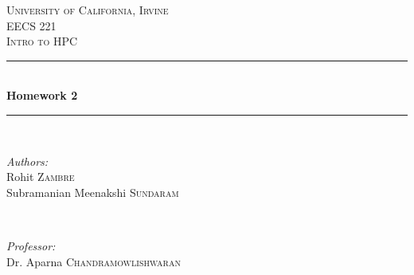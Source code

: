 \documentclass[12pt]{article}
\newcommand{\HRule}{\rule{\linewidth}{0.5mm}} %
\begin{document}
\begin{titlepage}

\center %


\textsc{\LARGE University of California, Irvine}\\[1.5cm] %
\textsc{\Large EECS 221}\\[0.5cm] %
\textsc{\large Intro to HPC}\\[0.5cm] %


\HRule \\[0.4cm]
{ \huge \bfseries Homework 2}\\[0.4cm] %
\HRule \\[1.5cm]


\begin{minipage}{0.4\textwidth}
	\begin{flushleft} \large
		\emph{Authors:}\\
		Rohit \textsc{Zambre}\\ %
		Subramanian Meenakshi \textsc{Sundaram}
	\end{flushleft}
\end{minipage}
~
\begin{minipage}{0.4\textwidth}
	\begin{flushright} \large
		\emph{Professor:} \\
		Dr. Aparna \textsc{Chandramowlishwaran} %
	\end{flushright}
\end{minipage}\\[2cm]



\end{titlepage}
\end{document}
